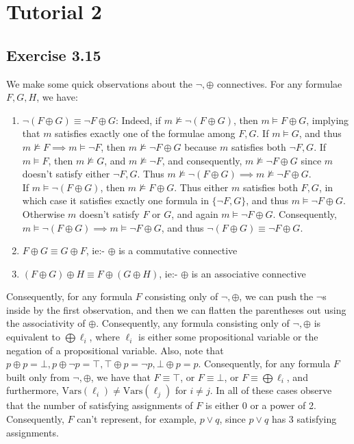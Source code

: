 \documentclass{article}
\newcommand{\Vars}{\mathrm{Vars}}
\begin{document}
\section{Tutorial 2}
\subsection*{Exercise 3.15}
We make some quick observations about the $\lnot, \oplus$ connectives. For any formulae $F, G, H$, we have:
\begin{enumerate}
    \item $\lnot(F\oplus G) \equiv \lnot F\oplus G$: Indeed, if $m\not\models \lnot(F\oplus G)$, then $m\models F\oplus G$, implying that $m$ satisfies exactly one of the formulae among $F, G$. If $m\models G$, and thus $m\not\models F\implies m\models\lnot F$, then $m\not\models\lnot F\oplus G$ because $m$ satisfies both $\lnot F, G$. If $m\models F$, then $m\not\models G$, and $m\not\models\lnot F$, and consequently, $m\not\models\lnot F\oplus G$ since $m$ doesn't satisfy either $\lnot F, G$. Thus $m\not\models\lnot(F\oplus G)\implies m\not\models\lnot F\oplus G$.\\
    If $m\models\lnot(F\oplus G)$, then $m\not\models F\oplus G$. Thus either $m$ satisfies both $F, G$, in which case it satisfies exactly one formula in $\{\lnot F, G\}$, and thus $m\models\lnot F\oplus G$. Otherwise $m$ doesn't satisfy $F$ or $G$, and again $m\models\lnot F\oplus G$. Consequently, $m\models\lnot(F\oplus G)\implies m\models\lnot F\oplus G$, and thus $\lnot(F\oplus G)\equiv\lnot F\oplus G$.
    \item $F\oplus G\equiv G\oplus F$, ie:- $\oplus$ is a commutative connective
    \item $(F\oplus G)\oplus H \equiv F\oplus (G\oplus H)$, ie:- $\oplus$ is an associative connective
\end{enumerate}
Consequently, for any formula $F$ consisting only of $\lnot, \oplus$, we can push the $\lnot$s inside by the first observation, and then we can flatten the parentheses out using the associativity of $\oplus$. Consequently, any formula consisting only of $\lnot, \oplus$ is equivalent to $\bigoplus\ell_i$, where $\ell_i$ is either some propositional variable or the negation of a propositional variable. Also, note that $p\oplus p = \bot, p\oplus\lnot p = \top, \top\oplus p = \lnot p, \bot\oplus p = p$. Consequently, for any formula $F$ built only from $\lnot, \oplus$, we have that $F\equiv\top$, or $F\equiv\bot$, or $F\equiv\bigoplus\ell_i$, and furthermore, $\Vars(\ell_i)\neq\Vars(\ell_j)$ for $i\neq j$. In all of these cases observe that the number of satisfying assignments of $F$ is either $0$ or a power of 2. Consequently, $F$ can't represent, for example, $p\lor q$, since $p\lor q$ has 3 satisfying assignments.
\end{document}
